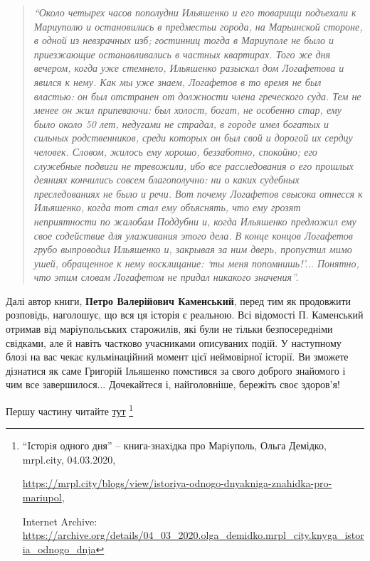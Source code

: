 \begin{quote}
\em \enquote{Около четырех часов пополудни Ильяшенко и его товарищи подъехали к
Мариуполю и остановились в предместьи города, на Марьинской стороне, в одной из
невзрачных изб; гостинниц тогда в Мариуполе не было и приезжающие
останавливались в частных квартирах. Того же дня вечером, когда уже стемнело,
Ильяшенко разыскал дом Логафетова и явился к нему. Как мы уже знаем, Логафетов
в то время не был властью: он был отстранен от должности члена греческого суда.
Тем не менее он жил припеваючи: был холост, богат, не особенно стар, ему было
около 50 лет, недугами не страдал, в городе имел богатых и сильных
родственников, среди которых он был свой и дорогой их сердцу человек. Словом,
жилось ему хорошо, беззаботно, спокойно; его служебные подвиги не тревожили,
ибо все расследования о его прошлых деяниях кончились совсем благополучно: ни о
каких судебных преследованиях не было и речи. Вот почему Логафетов свысока
отнесся к Ильяшенко, когда тот стал ему объяснять, что ему грозят неприятности
по жалобам Поддубни и, когда Ильяшенко предложил ему свое содействие для
улаживания этого дела. В конце концов Логафетов грубо выпроводил Ильяшенко и,
закрывая за ним дверь, пропустил мимо ушей, обращенное к нему восклицание: \enquote{ты
меня попомнишь!}... Понятно, что этим словам Логафетом не придал никакого
значения}.
\end{quote}

Далі автор книги, \textbf{Петро Валерійович Каменський}, перед тим як продовжити
розповідь, наголошує, що вся ця історія є реальною. Всі відомості П. Каменський
отримав від маріупольських старожилів, які були не тільки безпосередніми
свідками, але й навіть частково учасниками описуваних подій. У наступному блозі
на вас чекає кульмінаційний момент цієї неймовірної історії. Ви зможете
дізнатися як саме Григорій Ільяшенко помстився за свого доброго знайомого і чим
все завершилося... Дочекайтеся і, найголовніше, бережіть своє здоров'я!

Першу частину читайте \href{https://archive.org/details/04_03_2020.olga_demidko.mrpl_city.knyga_istoria_odnogo_dnja}{тут}%
\footnote{\enquote{Iсторiя одного дня} – книга-знахiдка про Марiуполь, Ольга Демідко, mrpl.city, 04.03.2020, \par%
\url{https://mrpl.city/blogs/view/istoriya-odnogo-dnyakniga-znahidka-pro-mariupol}, \par%
Internet Archive: \url{https://archive.org/details/04_03_2020.olga_demidko.mrpl_city.knyga_istoria_odnogo_dnja}
}
